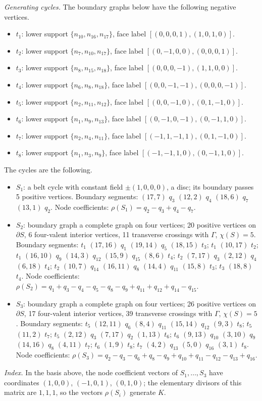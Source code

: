 \emph{Generating cycles.}
The boundary graphs below have the following negative vertices.
\begin{itemize}
\item $t_{1}$: lower support $\{n_{10},n_{16},n_{17}\}$, face label $[(0,0,0,1),(1,0,1,0)]$.
\item $t_{2}$: lower support $\{n_{7},n_{10},n_{17}\}$, face label $[(0,-1,0,0),(0,0,0,1)]$.
\item $t_{3}$: lower support $\{n_{8},n_{15},n_{18}\}$, face label $[(0,0,0,-1),(1,1,0,0)]$.
\item $t_{4}$: lower support $\{n_{6},n_{8},n_{18}\}$, face label $[(0,0,-1,-1),(0,0,0,-1)]$.
\item $t_{5}$: lower support $\{n_{2},n_{11},n_{12}\}$, face label $[(0,0,-1,0),(0,1,-1,0)]$.
\item $t_{6}$: lower support $\{n_{1},n_{9},n_{13}\}$, face label $[(0,-1,0,-1),(0,-1,1,0)]$.
\item $t_{7}$: lower support $\{n_{2},n_{4},n_{11}\}$, face label $[(-1,1,-1,1),(0,1,-1,0)]$.
\item $t_{8}$: lower support $\{n_{1},n_{3},n_{9}\}$, face label $[(-1,-1,1,0),(0,-1,1,0)]$.
\end{itemize}
The cycles are the following.
\begin{itemize}
\item $S_{1}$: a belt cycle with constant field $\pm(1,0,0,0)$, a disc; its boundary passes 5 positive vertices.
Boundary segments: $(17,7)$ $q_{3}$ $(12,2)$ $q_{4}$ $(18,6)$ $q_{7}$ $(13,1)$ $q_{2}$.
Node coefficients: $\rho(S_{1})=q_{2}-q_{3}+q_{4}-q_{7}$.
\item $S_{2}$: boundary graph a complete graph on four vertices; 20 positive vertices on $\partial S$, 6 four-valent interior vertices, 11 transverse crossings with $\Gamma$, $\chi(S)=5$.
Boundary segments: $t_{1}$ $(17,16)$ $q_{1}$ $(19,14)$ $q_{5}$ $(18,15)$ $t_{3}$; $t_{1}$ $(10,17)$ $t_{2}$; $t_{1}$ $(16,10)$ $q_{9}$ $(14,3)$ $q_{12}$ $(15,9)$ $q_{15}$ $(8,6)$ $t_{4}$; $t_{2}$ $(7,17)$ $q_{3}$ $(2,12)$ $q_{4}$ $(6,18)$ $t_{4}$; $t_{2}$ $(10,7)$ $q_{14}$ $(16,11)$ $q_{8}$ $(14,4)$ $q_{11}$ $(15,8)$ $t_{3}$; $t_{3}$ $(18,8)$ $t_{4}$.
Node coefficients: $\rho(S_{2})=q_{1}+q_{3}-q_{4}-q_{5}-q_{8}-q_{9}+q_{11}+q_{12}+q_{14}-q_{15}$.
\item $S_{3}$: boundary graph a complete graph on four vertices; 26 positive vertices on $\partial S$, 17 four-valent interior vertices, 39 transverse crossings with $\Gamma$, $\chi(S)=5$.
Boundary segments: $t_{5}$ $(12,11)$ $q_{6}$ $(8,4)$ $q_{11}$ $(15,14)$ $q_{12}$ $(9,3)$ $t_{8}$; $t_{5}$ $(11,2)$ $t_{7}$; $t_{5}$ $(2,12)$ $q_{3}$ $(7,17)$ $q_{2}$ $(1,13)$ $t_{6}$; $t_{6}$ $(9,13)$ $q_{10}$ $(3,10)$ $q_{9}$ $(14,16)$ $q_{8}$ $(4,11)$ $t_{7}$; $t_{6}$ $(1,9)$ $t_{8}$; $t_{7}$ $(4,2)$ $q_{13}$ $(5,0)$ $q_{16}$ $(3,1)$ $t_{8}$.
Node coefficients: $\rho(S_{3})=q_{2}-q_{3}-q_{6}+q_{8}-q_{9}+q_{10}+q_{11}-q_{12}-q_{13}+q_{16}$.
\end{itemize}
\emph{Index.} In the basis above, the node coefficient vectors of $S_1,\dots,S_{3}$ have coordinates $(1,0,0)$, $(-1,0,1)$, $(0,1,0)$; the elementary divisors of this matrix are $1,1,1$, so the vectors $\rho(S_i)$ generate $K$.

